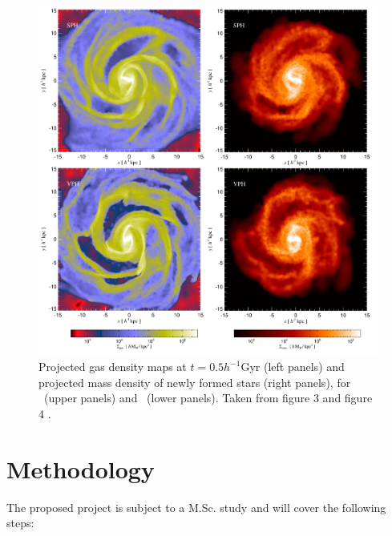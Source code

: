 \documentclass[a4,useAMS,usenatbib,usegraphicx,12pt]{article}
\begin{document}
\begin{figure}[h]
\centering

  \includegraphics[trim = 0mm 0mm 0mm 0mm, clip, keepaspectratio=true,
  width=0.58\textheight]{./figures/Galaxy.png}
  
  \caption{\small Projected gas density maps at $t=0.5h^{-1}$Gyr (left panels)
  and projected mass density of newly formed stars (right panels), for \SPH\ 
  (upper panels) and \VPH\ (lower panels). Taken from figure 3 and figure 4
  \citet{Hess12}.}

  \label{fig:Galaxy}

\end{figure}



\newpage
\section{Methodology}
The proposed project is subject to a M.Sc. study and will cover the following 
steps:
\end{document}
